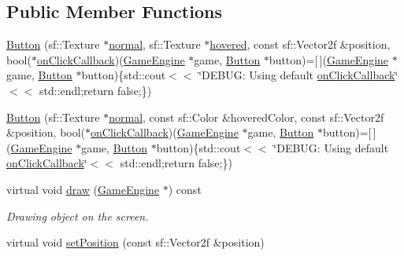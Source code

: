 \subsection*{Public Member Functions}
\begin{DoxyCompactItemize}
\item 
\mbox{\hyperlink{class_button_ad1a553528260f66367628724384cdfd0}{Button}} (sf\+::\+Texture $\ast$\mbox{\hyperlink{class_button_a5a2a5e1c6b378762f5b2fe39e9053d9e}{normal}}, sf\+::\+Texture $\ast$\mbox{\hyperlink{class_button_a181477cb3462763b510a30a4f27cd756}{hovered}}, const sf\+::\+Vector2f \&position, bool($\ast$\mbox{\hyperlink{class_button_abd70dfccd5cce2eb6d4cae1d684107c3}{on\+Click\+Callback}})(\mbox{\hyperlink{class_game_engine}{Game\+Engine}} $\ast$game, \mbox{\hyperlink{class_button}{Button}} $\ast$button)=\mbox{[}$\,$\mbox{]}(\mbox{\hyperlink{class_game_engine}{Game\+Engine}} $\ast$game, \mbox{\hyperlink{class_button}{Button}} $\ast$button)\{std\+::cout$<$$<$ \char`\"{}D\+E\+B\+U\+G\+: Using default \mbox{\hyperlink{class_button_abd70dfccd5cce2eb6d4cae1d684107c3}{on\+Click\+Callback}}\char`\"{}$<$$<$ std\+::endl;return false;\})
\item 
\mbox{\hyperlink{class_button_ad1756d01fbebe40e07b45fd1963c33d8}{Button}} (sf\+::\+Texture $\ast$\mbox{\hyperlink{class_button_a5a2a5e1c6b378762f5b2fe39e9053d9e}{normal}}, const sf\+::\+Color \&hovered\+Color, const sf\+::\+Vector2f \&position, bool($\ast$\mbox{\hyperlink{class_button_abd70dfccd5cce2eb6d4cae1d684107c3}{on\+Click\+Callback}})(\mbox{\hyperlink{class_game_engine}{Game\+Engine}} $\ast$game, \mbox{\hyperlink{class_button}{Button}} $\ast$button)=\mbox{[}$\,$\mbox{]}(\mbox{\hyperlink{class_game_engine}{Game\+Engine}} $\ast$game, \mbox{\hyperlink{class_button}{Button}} $\ast$button)\{std\+::cout$<$$<$ \char`\"{}D\+E\+B\+U\+G\+: Using default \mbox{\hyperlink{class_button_abd70dfccd5cce2eb6d4cae1d684107c3}{on\+Click\+Callback}}\char`\"{}$<$$<$ std\+::endl;return false;\})
\item 
virtual void \mbox{\hyperlink{class_button_a99e75218b31357786cff815f87f1a093}{draw}} (\mbox{\hyperlink{class_game_engine}{Game\+Engine}} $\ast$) const
\begin{DoxyCompactList}\small\item\em Drawing object on the screen. \end{DoxyCompactList}\item 
virtual void \mbox{\hyperlink{class_button_a95a9aafc24ed5d95d3557f7155832433}{set\+Position}} (const sf\+::\+Vector2f \&position)
\item 

\end{DoxyCompactItemize}

